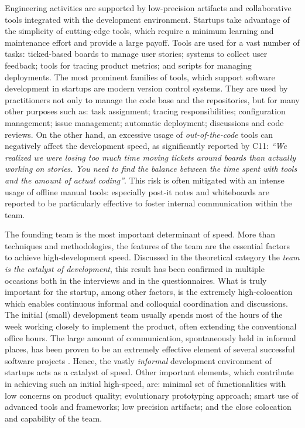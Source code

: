\documentclass[10pt,journal,letterpaper,compsoc]{IEEEtran}
\begin{document}
\begin{compactitem}
\item Engineering activities are supported by low-precision artifacts and 
collaborative tools integrated with the development environment. Startups take 
advantage of the simplicity of cutting-edge tools, which require a minimum 
learning and maintenance effort and provide a large payoff.  Tools are used for 
a vast number of tasks: ticked-based boards to manage user stories; systems to 
collect user feedback; tools for tracing product metrics; and scripts for 
managing deployments. The most prominent families of tools, which support 
software development in startups are modern version control systems. They are 
used by practitioners not only to manage the code base and the repositories, but 
for many other purposes such as: task assignment; tracing responsibilities; 
configuration management; issue management; automatic deployment; discussions 
and code reviews.  On the other hand, an excessive usage of  
\textit{out-of-the-code} tools can negatively affect the development speed, as 
significantly reported by C11: \textit{``We realized we were losing too much 
time moving tickets around boards than actually working on stories. You need to 
find the balance between the time spent with tools and the amount of actual 
coding''}. This risk is often mitigated with an intense usage of offline manual 
tools: especially post-it notes and whiteboards are reported to be particularly 
effective to foster internal communication within the team. 

\item The founding team is the most important determinant of speed. More than 
techniques and methodologies, the features of the team are the essential factors 
to achieve high-development speed. Discussed in the theoretical category the 
\textit{team is the catalyst of development}, this result has been confirmed in 
multiple occasions both in the interviews and in the questionnaires. What is 
truly important for the startup, among other factors, is the extremely 
high-colocation which enables continuous informal and colloquial coordination 
and discussions. The initial (small) development team usually spends most of the 
hours of the week working closely to implement the product, often extending the 
conventional office hours.  The large amount of communication, spontaneously 
held in informal places, has been proven to be an extremely effective element of 
several successful software projects \cite{Highsmith2000}. Hence, the vastly 
\textit{informal} development environment of startups acts as a catalyst of 
speed. Other important elements, which contribute in achieving such an initial 
high-speed, are: minimal set of functionalities with low concerns on product 
quality; evolutionary prototyping approach; smart use of advanced tools and 
frameworks; low precision artifacts; and the close colocation and capability of 
the team.


\end{compactitem}
\end{document}
